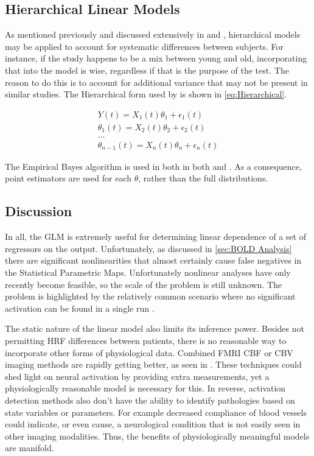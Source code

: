 \subsection{Hierarchical Linear Models}
As mentioned previously and discussed extensively
in \cite{Friston2002} and \cite{Hofmann1997}, hierarchical models may be 
applied to account for systematic differences between subjects. For instance, if the
study happens to be a mix between young and old, incorporating
that into the model is wise, regardless if that is the purpose of the test. 
The reason to do this is to account for additional variance that may not
be present in similar studies. The Hierarchical form used by
\cite{Friston2002} is shown in \autoref{eq:Hierarchical}.

\begin{eqnarray}
\label{eq:Hierarchical}
Y(t) = X_1(t)\theta_1 + \epsilon_1(t)            \nonumber \\
\theta_1(t) = X_2(t)\theta_2 + \epsilon_2(t)     \nonumber \\
...                                              \nonumber \\
\theta_{n-1}(t) = X_n(t)\theta_n + \epsilon_n(t) 
\end{eqnarray}

The Empirical Bayes algorithm is used in both in both \cite{Friston2002} 
and \cite{Hofmann1997}. As a consequence, point estimators 
are used for each $\theta$, rather than the full distributions.

\subsection{Discussion}
\label{sec:BackgroundConclusion}
In all, the GLM is extremely useful for determining linear 
dependence of a set of regressors on the output. Unfortunately, as discussed in
\autoref{sec:BOLD Analysis} there are significant nonlinearities 
that almost certainly cause false negatives in the Statistical Parametric
Maps. Unfortunately nonlinear analyses have only recently become feasible,
so the scale of the problem is still unknown. The problem is 
highlighted by the relatively common scenario where no significant
activation can be found in a single run \cite{Riera2004}
\cite{Johnston2008}.  

The static nature of the  linear model also limits its inference power. 
Besides not permitting HRF differences between patients, there is no
reasonable way to incorporate other forms of physiological
data. Combined FMRI CBF or CBV imaging methods are rapidly getting better,
as seen in \cite{Chen2009}. These techniques could shed light on
neural activation by providing extra measurements, yet a 
physiologically reasonable model is necessary for this.
In reverse, activation detection methods also don't have the ability 
to identify pathologies based on state variables or parameters. For
example decreased compliance of
blood vessels could indicate, or even cause, a neurological condition that 
is not easily seen in other imaging modalities. Thus, the benefits
of physiologically meaningful models are manifold.

